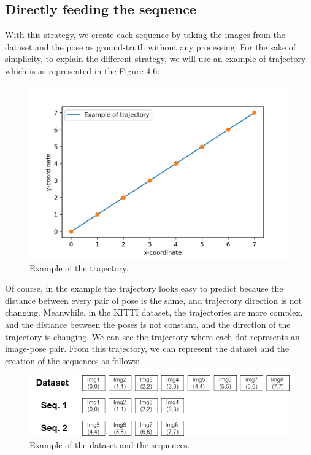 \subsection{Directly feeding the sequence}\label{subsec:directly-feeding-the-sequence}
With this strategy, we create each sequence by taking the images from the dataset and the pose as ground-truth without any processing.
For the sake of simplicity, to explain the different strategy, we will use an example of trajectory which is as represented in the Figure 4.6:
\begin{figure}[H]
    \centering
    \includegraphics[width=\textwidth]{images/4_2_example_of_trajectory}
    \caption{Example of the trajectory.}
    \label{fig:example-of-trajectory}
\end{figure}
Of course, in the example the trajectory looks easy to predict because the distance between every pair of pose is the same, and trajectory direction is not changing.
Meanwhile, in the KITTI dataset, the trajectories are more complex, and the distance between the poses is not constant, and the direction of the trajectory is changing.
We can see the trajectory where each dot represents an image-pose pair.
From this trajectory, we can represent the dataset and  the creation of the sequences as follows:
\begin{figure}[H]
    \centering
    \includegraphics[width=\textwidth]{images/4_2_directly_feeding}
    \caption{Example of the dataset and the sequences.}
    \label{fig:example-of-dataset}
\end{figure}
